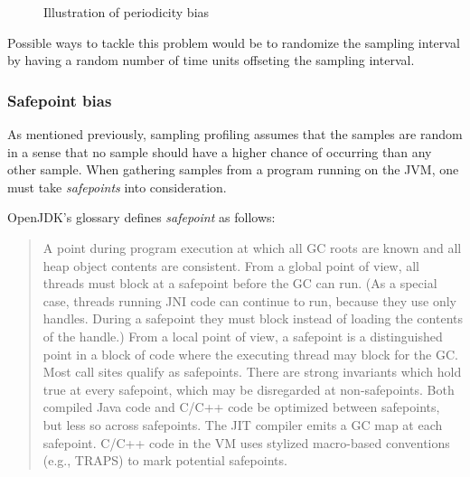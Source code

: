 \documentclass[..thesis.tex]{subfiles}
\begin{document}
\begin{figure}[H]
\centering
{}
\caption{Illustration of periodicity bias}
\label{fig:periodicityBias}
\end{figure}


Possible ways to tackle this problem would be to randomize the sampling interval by having a random number of time units offseting the sampling interval.
\subsubsection{Safepoint bias}
As mentioned previously, sampling profiling assumes that the samples are random in a sense that no sample should have a higher chance of occurring than any other sample. When gathering samples from a program running on the JVM, one must take \textit{safepoints} into consideration.

OpenJDK's glossary \cite{jdk_glossary} defines \textit{safepoint} as follows: 
\begin{quote}
A point during program execution at which all GC roots are known and all heap object contents are consistent. From a global point of view, all threads must block at a safepoint before the GC can run. (As a special case, threads running JNI code can continue to run, because they use only handles. During a safepoint they must block instead of loading the contents of the handle.) From a local point of view, a safepoint is a distinguished point in a block of code where the executing thread may block for the GC. Most call sites qualify as safepoints. There are strong invariants which hold true at every safepoint, which may be disregarded at non-safepoints. Both compiled Java code and C/C++ code be optimized between safepoints, but less so across safepoints. The JIT compiler emits a GC map at each safepoint. C/C++ code in the VM uses stylized macro-based conventions (e.g., TRAPS) to mark potential safepoints.
\end{quote}
\end{document}
